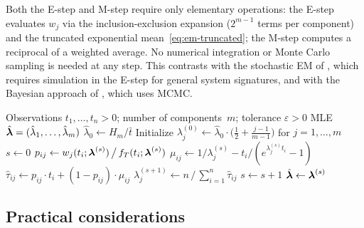 \begin{remark}
  \label{rem:em-closed-form}
  Both the E-step and M-step require only elementary operations:
  the E-step evaluates $w_j$ via the inclusion-exclusion expansion
  ($2^{m-1}$ terms per component) and the truncated exponential
  mean~\eqref{eq:em-truncated}; the M-step computes a reciprocal
  of a weighted average.  No numerical integration or Monte Carlo
  sampling is needed at any step.  This contrasts with the stochastic
  EM of \citet{NgNavarroBalakrishnan2017}, which requires simulation
  in the E-step for general system signatures, and with the Bayesian
  approach of \citet{BheringPereiraPolpo2014}, which uses MCMC.
\end{remark}

\begin{algorithm}[t]
  \caption{EM algorithm for exponential parallel system MLE}
  \label{alg:em}
  \begin{algorithmic}[1]
    \Require Observations $t_1,\ldots,t_n > 0$;\;
             number of components~$m$;\;
             tolerance $\varepsilon > 0$
    \Ensure  MLE $\hat{\boldsymbol{\lambda}} = (\hat\lambda_1,\ldots,\hat\lambda_m)$
    \State $\hat\lambda_0 \gets H_m / \bar{t}$
    \State Initialize $\lambda_j^{(0)} \gets \hat\lambda_0 \cdot
      \bigl(\tfrac{1}{2} + \tfrac{j-1}{m-1}\bigr)$ for $j = 1,\ldots,m$
    \State $s \gets 0$
    \Repeat
        \State $p_{ij} \gets w_j(t_i;\boldsymbol{\lambda}^{(s)}) \,\big/\, f_T(t_i;\boldsymbol{\lambda}^{(s)})$
        \State $\mu_{ij} \gets 1/\lambda_j^{(s)} - t_i\big/(e^{\lambda_j^{(s)} t_i} - 1)$
        \State $\hat\tau_{ij} \gets p_{ij}\cdot t_i + (1 - p_{ij})\cdot \mu_{ij}$
      \EndFor
        \State $\lambda_j^{(s+1)} \gets n \,\big/\, \sum_{i=1}^n \hat\tau_{ij}$
      \EndFor
      \State $s \gets s + 1$
    \State \Return $\hat{\boldsymbol{\lambda}} \gets \boldsymbol{\lambda}^{(s)}$
  \end{algorithmic}
\end{algorithm}

\subsection{Practical considerations}
\label{sub:practical}

